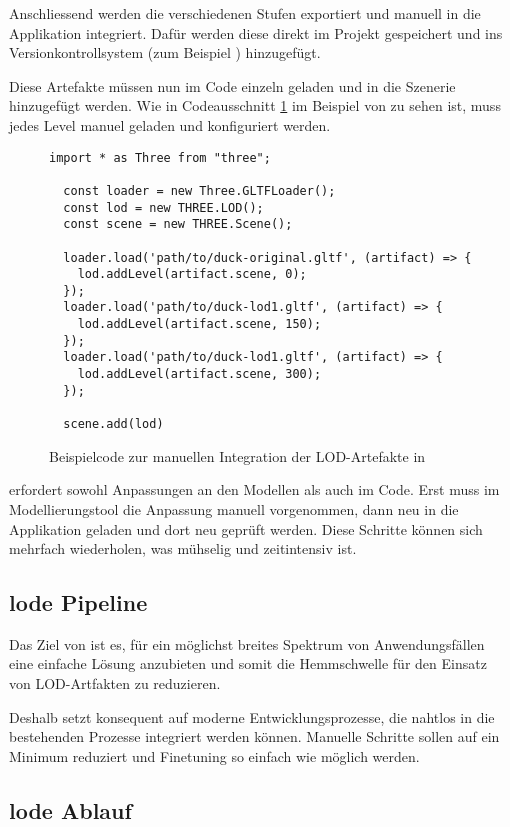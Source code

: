 Anschliessend werden die verschiedenen Stufen exportiert und manuell in die Applikation integriert. Dafür werden diese direkt im Projekt gespeichert und ins Versionkontrollsystem (zum Beispiel ) hinzugefügt.

Diese Artefakte müssen nun im Code einzeln geladen und in die Szenerie hinzugefügt werden. Wie in Codeausschnitt \ref{code:threejsManualLodUsage} im Beispiel von  zu sehen ist, muss jedes Level manuel geladen und konfiguriert werden.
\begin{figure}[H]
  \begin{lstlisting}[style=JavaScript]
  import * as Three from "three";

  const loader = new Three.GLTFLoader();
  const lod = new THREE.LOD();
  const scene = new THREE.Scene();

  loader.load('path/to/duck-original.gltf', (artifact) => {
    lod.addLevel(artifact.scene, 0);
  });
  loader.load('path/to/duck-lod1.gltf', (artifact) => {
    lod.addLevel(artifact.scene, 150);
  });
  loader.load('path/to/duck-lod1.gltf', (artifact) => {
    lod.addLevel(artifact.scene, 300);
  });

  scene.add(lod)
  \end{lstlisting}
  \caption{Beispielcode zur manuellen Integration der LOD-Artefakte in }
  \label{code:threejsManualLodUsage}
\end{figure}

 erfordert sowohl Anpassungen an den Modellen als auch im Code. Erst muss im Modellierungstool die Anpassung manuell vorgenommen, dann neu in die Applikation geladen und dort neu geprüft werden. Diese Schritte können sich mehrfach wiederholen, was mühselig und zeitintensiv ist.

\subsection{lode Pipeline}

Das Ziel von  ist es, für ein möglichst breites Spektrum von Anwendungsfällen eine einfache Lösung anzubieten und somit die Hemmschwelle für den Einsatz von LOD-Artfakten zu reduzieren.

Deshalb setzt  konsequent auf moderne Entwicklungsprozesse, die nahtlos in die bestehenden Prozesse integriert werden können. Manuelle Schritte sollen auf ein Minimum reduziert und Finetuning so einfach wie möglich werden.

\subsection{lode Ablauf}

